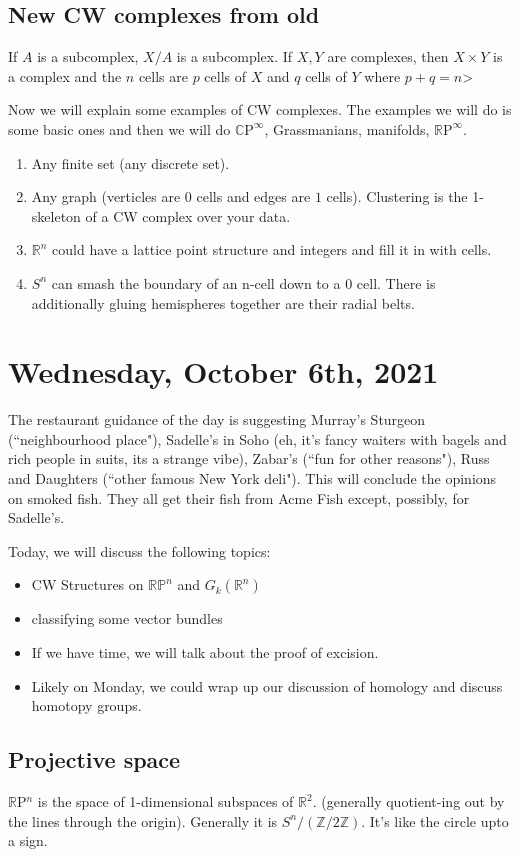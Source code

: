 \documentclass[12pt]{article}
\theoremstyle{definition}
\begin{document}
	\subsection{New CW complexes from old}
	If $A$ is a subcomplex, $X/A$ is a subcomplex.  If $X, Y$ are complexes, then $X\times Y$ is a complex and the $n$ cells are $p$ cells of $X$ and $q$ cells of $Y$ where $p+q=n$> 
	
	Now we will explain some examples of CW complexes.  The examples we will do is some basic ones and then we will do $\mathbb{C}\text{P}^\infty$, Grassmanians, manifolds, $\mathbb{R}\text{P}^\infty$. 
	\begin{enumerate}
		\item Any finite set (any discrete set). 
		\item Any graph (verticles are $0$ cells and edges are $1$ cells). Clustering is the 1-skeleton of a CW complex over your data.
		\item $\mathbb{R}^n$ could have a lattice point structure and integers and fill it in with cells. 
		\item $S^n$ can smash the boundary of an n-cell down to a $0$ cell. There is additionally gluing hemispheres together are their radial belts. 
	\end{enumerate}
	\section{Wednesday, October 6th, 2021}
		The restaurant guidance of the day is suggesting Murray's Sturgeon (``neighbourhood place"), Sadelle's in Soho (eh, it's fancy waiters with bagels and rich people in suits, its a strange vibe), Zabar's (``fun for other reasons"), Russ and Daughters (``other famous New York deli"). This will conclude the opinions on smoked fish. They all get their fish from Acme Fish except, possibly, for Sadelle's.
	
	Today, we will discuss the following topics:
	\begin{itemize}
		\item CW Structures on $\mathbb{RP}^n$ and $G_k(\mathbb{R}^n)$ 
		\item classifying some vector bundles
		\item If we have time, we will talk about the proof of excision. 
		\item Likely on Monday, we could wrap up our discussion of homology and discuss homotopy groups. 
	\end{itemize}
	\subsection{Projective space}
	$\mathbb{R}$P$^n$ is the space of 1-dimensional subspaces of $\mathbb{R}^2$. (generally quotient-ing out by the lines through the origin). Generally it is $S^n/(\mathbb{Z}/2\mathbb{Z})$. It's like the circle upto a sign.
	
\end{document}
